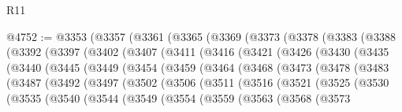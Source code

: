 \begin{lexlean}{R11}
\begin{coremodule}
@4752 := @3353
    (@3357
      (@3361
        (@3365
          (@3369
            (@3373
              (@3378
                (@3383
                  (@3388
                    (@3392
                      (@3397
                        (@3402
                          (@3407
                            (@3411
                              (@3416
                                (@3421
                                  (@3426
                                    (@3430
                                      (@3435
                                        (@3440
                                          (@3445
                                            (@3449
                                              (@3454
                                                (@3459
                                                  (@3464
                                                    (@3468
                                                      (@3473
                                                        (@3478
                                                          (@3483
                                                            (@3487
                                                              (@3492
                                                                (@3497
                                                                  (@3502
                                                                    (@3506
                                                                      (@3511
                                                                        (@3516
                                                                          (@3521
                                                                            (@3525
                                                                              (@3530
                                                                                (@3535
                                                                                  (@3540
                                                                                    (@3544
                                                                                      (@3549
                                                                                        (@3554
                                                                                          (@3559
                                                                                            (@3563
                                                                                              (@3568
                                                                                                (@3573

\end{coremodule}
\end{lexlean}
